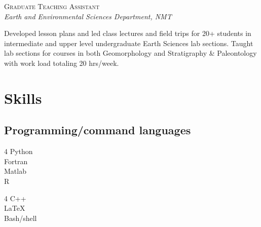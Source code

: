 \documentclass[11pt, letterpaper]{article}
\newcommand{\years}[1]{\marginnote{\scriptsize #1}}
\begin{document}
\years{2015 - 2016}\textsc{Graduate Teaching Assistant}\\
\textit{Earth and Environmental Sciences Department, NMT}

    Developed lesson plans and led class lectures and field trips for 20+
    students in intermediate and upper level undergraduate Earth Sciences lab
    sections. Taught lab sections for courses in both Geomorphology and Stratigraphy
    \& Paleontology with work load totaling 20 hrs/week.  

\section*{Skills}
\setlength{\parskip}{0pt}
\subsection*{Programming/command languages}
\noindent
%
\setlength\multicolsep{0pt} %
\begin{multicols}{4}
    Python\\
    Fortran\\
    Matlab\\
    R
\end{multicols}
\begin{multicols}{4}
    C++\\
    \LaTeX\\
    Bash/shell\\
\end{multicols}
%
%
\end{document}
